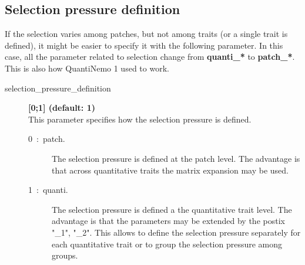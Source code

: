 \documentclass[letterpaper,12pt,oneside]{book}
\begin{document}
\begin{appendices}
\section{Selection pressure definition}\label{chap:SelectionPressureDefinition}
If the selection varies among patches, but not among traits (or a single trait is defined), it might be easier to specify it with the following parameter. In this case, all the parameter related to selection change from \textbf{quanti\_*} to \textbf{patch\_*}. This is also how QuantiNemo 1 used to work. 
\begin{description}
\item[selection\_pressure\_definition\index{}]\textbf{[0;1] (default: 1)}\\
This parameter specifies how the selection pressure is defined. 
\begin{description}
\item[0~:~patch.] The selection pressure is defined at the patch level. The advantage is that across quantitative traits the matrix expansion may be used.
\item[1~:~quanti.] The selection pressure is defined a the quantitative trait level. The advantage is that the parameters may be extended by the postix "\_1", "\_2". This allows to define the selection pressure separately for each quantitative trait or to group the selection pressure among groups.
\end{description}
\end{description}

\end{appendices}
\end{document}
